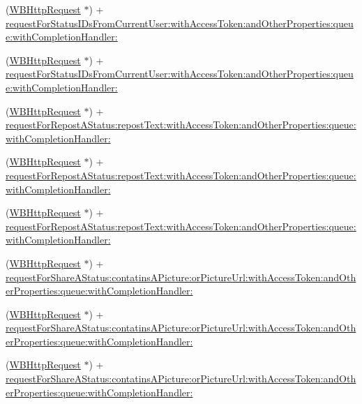 \begin{DoxyCompactItemize}
\item 
(\mbox{\hyperlink{interface_w_b_http_request}{W\+B\+Http\+Request}} $\ast$) + \mbox{\hyperlink{interface_w_b_http_request_ac75a0b99ef6dba004af29cd7c2498149}{request\+For\+Status\+I\+Ds\+From\+Current\+User\+:with\+Access\+Token\+:and\+Other\+Properties\+:queue\+:with\+Completion\+Handler\+:}}
\item 
(\mbox{\hyperlink{interface_w_b_http_request}{W\+B\+Http\+Request}} $\ast$) + \mbox{\hyperlink{interface_w_b_http_request_ac75a0b99ef6dba004af29cd7c2498149}{request\+For\+Status\+I\+Ds\+From\+Current\+User\+:with\+Access\+Token\+:and\+Other\+Properties\+:queue\+:with\+Completion\+Handler\+:}}
\item 
(\mbox{\hyperlink{interface_w_b_http_request}{W\+B\+Http\+Request}} $\ast$) + \mbox{\hyperlink{interface_w_b_http_request_ae32a41361851196fcf0ffc22b4354581}{request\+For\+Repost\+A\+Status\+:repost\+Text\+:with\+Access\+Token\+:and\+Other\+Properties\+:queue\+:with\+Completion\+Handler\+:}}
\item 
(\mbox{\hyperlink{interface_w_b_http_request}{W\+B\+Http\+Request}} $\ast$) + \mbox{\hyperlink{interface_w_b_http_request_ae32a41361851196fcf0ffc22b4354581}{request\+For\+Repost\+A\+Status\+:repost\+Text\+:with\+Access\+Token\+:and\+Other\+Properties\+:queue\+:with\+Completion\+Handler\+:}}
\item 
(\mbox{\hyperlink{interface_w_b_http_request}{W\+B\+Http\+Request}} $\ast$) + \mbox{\hyperlink{interface_w_b_http_request_ae32a41361851196fcf0ffc22b4354581}{request\+For\+Repost\+A\+Status\+:repost\+Text\+:with\+Access\+Token\+:and\+Other\+Properties\+:queue\+:with\+Completion\+Handler\+:}}
\item 
(\mbox{\hyperlink{interface_w_b_http_request}{W\+B\+Http\+Request}} $\ast$) + \mbox{\hyperlink{interface_w_b_http_request_ad1a9992eb9534605e3b5d1100a2e693a}{request\+For\+Share\+A\+Status\+:contatins\+A\+Picture\+:or\+Picture\+Url\+:with\+Access\+Token\+:and\+Other\+Properties\+:queue\+:with\+Completion\+Handler\+:}}
\item 
(\mbox{\hyperlink{interface_w_b_http_request}{W\+B\+Http\+Request}} $\ast$) + \mbox{\hyperlink{interface_w_b_http_request_ad1a9992eb9534605e3b5d1100a2e693a}{request\+For\+Share\+A\+Status\+:contatins\+A\+Picture\+:or\+Picture\+Url\+:with\+Access\+Token\+:and\+Other\+Properties\+:queue\+:with\+Completion\+Handler\+:}}
\item 
(\mbox{\hyperlink{interface_w_b_http_request}{W\+B\+Http\+Request}} $\ast$) + \mbox{\hyperlink{interface_w_b_http_request_ad1a9992eb9534605e3b5d1100a2e693a}{request\+For\+Share\+A\+Status\+:contatins\+A\+Picture\+:or\+Picture\+Url\+:with\+Access\+Token\+:and\+Other\+Properties\+:queue\+:with\+Completion\+Handler\+:}}

\end{DoxyCompactItemize}
